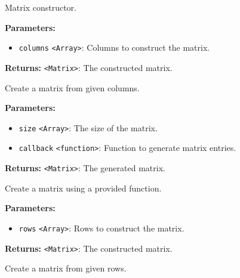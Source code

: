 \documentclass[12pt,a4paper]{article}
\begin{document}
\noindent Matrix constructor.

\vspace{5mm}
\noindent {}


\noindent \textbf{Parameters:}
\begin{itemize}
  \item \texttt{columns} \texttt{<Array>}: Columns to construct the matrix.
\end{itemize}

\noindent \textbf{Returns:} \texttt{<Matrix>}: The constructed matrix.

\noindent Create a matrix from given columns.

\vspace{5mm}
\noindent {}


\noindent \textbf{Parameters:}
\begin{itemize}
  \item \texttt{size} \texttt{<Array>}: The size of the matrix.
  \item \texttt{callback} \texttt{<function>}: Function to generate matrix entries.
\end{itemize}

\noindent \textbf{Returns:} \texttt{<Matrix>}: The generated matrix.

\noindent Create a matrix using a provided function.

\vspace{5mm}
\noindent {}


\noindent \textbf{Parameters:}
\begin{itemize}
  \item \texttt{rows} \texttt{<Array>}: Rows to construct the matrix.
\end{itemize}

\noindent \textbf{Returns:} \texttt{<Matrix>}: The constructed matrix.

\noindent Create a matrix from given rows.

\vspace{5mm}
\noindent {}
\end{document}

